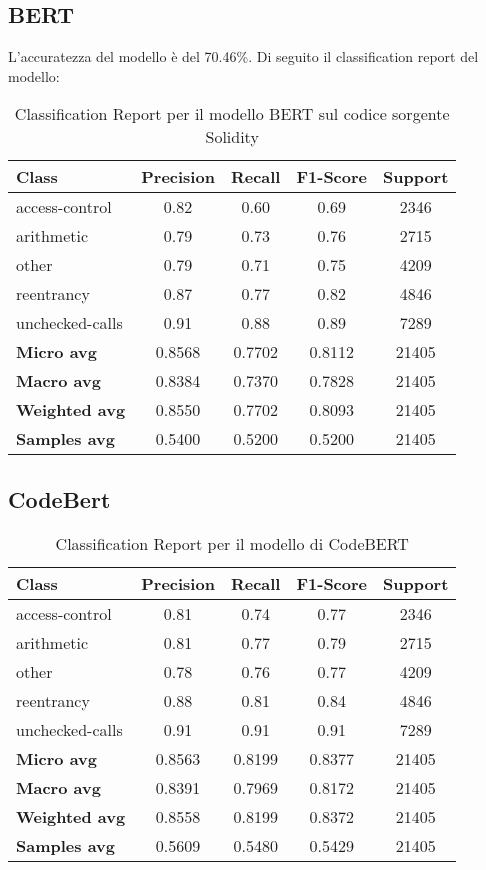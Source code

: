 \documentclass[../../Thesis.tex]{subfiles}
\begin{document}
\subsection{BERT}
L'accuratezza del modello è del 70.46\%. Di seguito il classification report del modello:
\begin{table}[H]
    \centering
    \small
    \begin{tabular}{lcccc}
    \hline
    \textbf{Class} & \textbf{Precision} & \textbf{Recall} & \textbf{F1-Score} & \textbf{Support} \\
    \hline
    access-control & 0.82 & 0.60 & 0.69 & 2346 \\
    arithmetic & 0.79 & 0.73 & 0.76 & 2715 \\
    other & 0.79 & 0.71 & 0.75 & 4209 \\
    reentrancy & 0.87 & 0.77 & 0.82 & 4846 \\
    unchecked-calls & 0.91 & 0.88 & 0.89 & 7289 \\
    \hline
    \textbf{Micro avg} & 0.8568 & 0.7702 & 0.8112 & 21405 \\
    \textbf{Macro avg} & 0.8384 & 0.7370 & 0.7828 & 21405 \\
    \textbf{Weighted avg} & 0.8550 & 0.7702 & 0.8093 & 21405 \\
    \textbf{Samples avg} & 0.5400 & 0.5200 & 0.5200 & 21405 \\
    \hline
    \end{tabular}
    \caption{Classification Report per il modello BERT sul codice sorgente Solidity}
\end{table}
\subsection{CodeBert}
\begin{table}[H]
    \centering
    \small
    \begin{tabular}{lcccc}
    \hline
    \textbf{Class} & \textbf{Precision} & \textbf{Recall} & \textbf{F1-Score} & \textbf{Support} \\
    \hline
    access-control & 0.81 & 0.74 & 0.77 & 2346 \\
    arithmetic & 0.81 & 0.77 & 0.79 & 2715 \\
    other & 0.78 & 0.76 & 0.77 & 4209 \\
    reentrancy & 0.88 & 0.81 & 0.84 & 4846 \\
    unchecked-calls & 0.91 & 0.91 & 0.91 & 7289 \\
    \hline
    \textbf{Micro avg} & 0.8563 & 0.8199 & 0.8377 & 21405 \\
    \textbf{Macro avg} & 0.8391 & 0.7969 & 0.8172 & 21405 \\
    \textbf{Weighted avg} & 0.8558 & 0.8199 & 0.8372 & 21405 \\
    \textbf{Samples avg} & 0.5609 & 0.5480 & 0.5429 & 21405 \\
    \hline
    \end{tabular}
    \caption{Classification Report per il modello di CodeBERT}
    \end{table}
\end{document}
